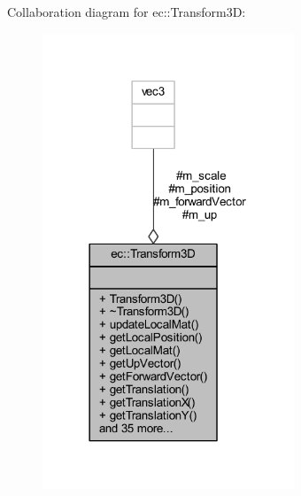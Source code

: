 Collaboration diagram for ec\+:\+:Transform3D\+:\nopagebreak
\begin{figure}[H]
\begin{center}
\leavevmode
\includegraphics[width=213pt]{classec_1_1_transform3_d__coll__graph}
\end{center}
\end{figure}
